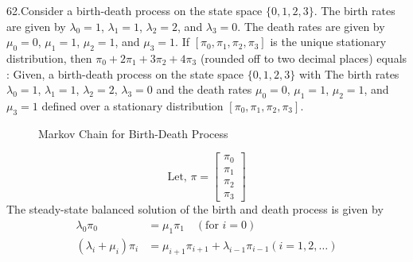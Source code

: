 \documentclass[journal,12pt,twocolumn]{IEEEtran}
\theoremstyle{remark}
\begin{document}
\renewcommand{\thefigure}{\theenumi}
\renewcommand{\thetable}{\theenumi}
62.Consider a birth-death process on the state space $\{0, 1, 2, 3\}$. The birth rates are
given by $\lambda_0 = 1$, $\lambda_1 = 1$, $\lambda_2 = 2$, and $\lambda_3 = 0$. The death rates are given by
$\mu_0 = 0$, $\mu_1 = 1$, $\mu_2 = 1$, and $\mu_3 = 1$. If $[\pi_0, \pi_1, \pi_2, \pi_3]$ is the unique
stationary distribution, then $\pi_0 + 2\pi_1 + 3\pi_2 + 4\pi_3$ (rounded off to two decimal places) equals
\\ \solution:
Given, a birth-death process on the state space $\{0, 1, 2, 3\}$ with The birth rates $\lambda_0 = 1$, $\lambda_1 = 1$, $\lambda_2 = 2$, $\lambda_3 = 0$ and the death rates $\mu_0 = 0$, $\mu_1 = 1$, $\mu_2 = 1$, and $\mu_3 = 1$ defined over a stationary distribution $[\pi_0, \pi_1, \pi_2, \pi_3]$.
\begin{figure}[h]
    \centering
    \caption{Markov Chain for Birth-Death Process}
    \label{fig:markov_chain}
\end{figure}
\begin{equation}
\label{eq:62.1}
\text{Let,  }
\pi = \begin{bmatrix}
\pi_0\\
\pi_1\\
\pi_2\\
\pi_3
\end{bmatrix}
\end{equation}
The steady-state balanced solution of the birth and death process is given by
\begin{equation}
\label{eq:62.2}
\begin{split}
\lambda_0\pi_0 &= \mu_1\pi_1 \quad (\text{for } i = 0)\\
(\lambda_i + \mu_i)\pi_i &= \mu_{i+1}\pi_{i+1} + \lambda_{i-1}\pi_{i-1} (i = 1,2,\ldots)
\end{split}
\end{equation}
\end{document}
